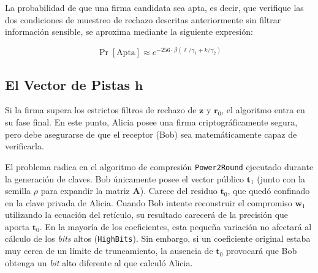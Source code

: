 \documentclass[11pt, a4paper]{report}
\theoremstyle{definition}
\begin{document}
\begin{table}[H]
    \centering
    \renewcommand{\arraystretch}{1.4}
    \caption{Parámetros y límites máximos permitidos en los filtros de rechazo del bucle de firma.}
    \label{tab:limites_rechazo}
\end{table}

La probabilidad de que una firma candidata sea apta, es decir, que verifique las dos condiciones de muestreo de rechazo descritas anteriormente sin filtrar información sensible, se aproxima mediante la siguiente expresión:

$$ \Pr[\text{Apta}] \approx e^{-256 \cdot \beta \left( \ell/\gamma_1 + k/\gamma_2 \right)} $$


\subsection{El Vector de Pistas $\mathbf{h}$}

Si la firma supera los estrictos filtros de rechazo de $\mathbf{z}$ y $\mathbf{r}_0$, el algoritmo entra en su fase final. En este punto, Alicia posee una firma criptográficamente segura, pero debe asegurarse de que el receptor (Bob) sea matemáticamente capaz de verificarla. 

El problema radica en el algoritmo de compresión \texttt{Power2Round} ejecutado durante la generación de claves. Bob únicamente posee el vector público $\mathbf{t}_1$ (junto con la semilla $\rho$ para expandir la matriz $\mathbf{A}$). Carece del residuo $\mathbf{t}_0$, que quedó confinado en la clave privada de Alicia. Cuando Bob intente reconstruir el compromiso $\mathbf{w}_1$ utilizando la ecuación del retículo, su resultado carecerá de la precisión que aporta $\mathbf{t}_0$. En la mayoría de los coeficientes, esta pequeña variación no afectará al cálculo de los \textit{bits} altos (\texttt{HighBits}). Sin embargo, si un coeficiente original estaba muy cerca de un límite de truncamiento, la ausencia de $\mathbf{t}_0$ provocará que Bob obtenga un \textit{bit} alto diferente al que calculó Alicia.
\end{document}
